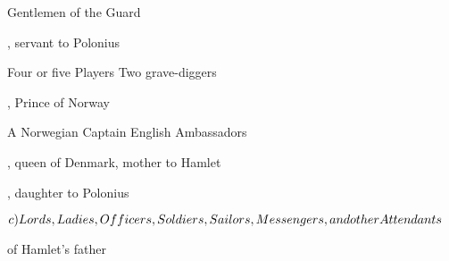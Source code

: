 \documentclass[11pt]{book}
\begin{document}
\begin{Characters}{Gentlemen of the Guard}
\end{Characters} 

, servant to Polonius

\begin{unnamed}
 Four or five Players
 Two grave-diggers
\end{unnamed}


, Prince of Norway

\begin{unnamed}
 A Norwegian Captain
 English Ambassadors
\end{unnamed}

\vacua

, queen of Denmark, mother to Hamlet

, daughter to Polonius

\(c) Lords, Ladies, Officers, Soldiers, Sailors, Messengers,\\
   and other Attendants\)

 of Hamlet's father 

\endgroup


\newpage

\pagestyle{maintext}




\end{document}
